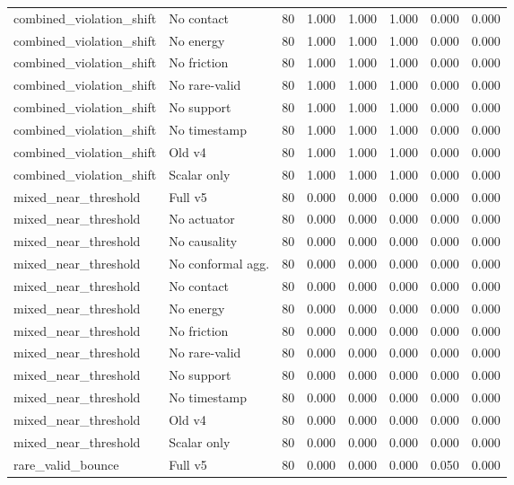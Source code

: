 {\begin{longtable}{llrrrrrr}
combined\_violation\_shift & No contact & 80 & 1.000 & 1.000 & 1.000 & 0.000 & 0.000 \\
combined\_violation\_shift & No energy & 80 & 1.000 & 1.000 & 1.000 & 0.000 & 0.000 \\
combined\_violation\_shift & No friction & 80 & 1.000 & 1.000 & 1.000 & 0.000 & 0.000 \\
combined\_violation\_shift & No rare-valid & 80 & 1.000 & 1.000 & 1.000 & 0.000 & 0.000 \\
combined\_violation\_shift & No support & 80 & 1.000 & 1.000 & 1.000 & 0.000 & 0.000 \\
combined\_violation\_shift & No timestamp & 80 & 1.000 & 1.000 & 1.000 & 0.000 & 0.000 \\
combined\_violation\_shift & Old v4 & 80 & 1.000 & 1.000 & 1.000 & 0.000 & 0.000 \\
combined\_violation\_shift & Scalar only & 80 & 1.000 & 1.000 & 1.000 & 0.000 & 0.000 \\
mixed\_near\_threshold & Full v5 & 80 & 0.000 & 0.000 & 0.000 & 0.000 & 0.000 \\
mixed\_near\_threshold & No actuator & 80 & 0.000 & 0.000 & 0.000 & 0.000 & 0.000 \\
mixed\_near\_threshold & No causality & 80 & 0.000 & 0.000 & 0.000 & 0.000 & 0.000 \\
mixed\_near\_threshold & No conformal agg. & 80 & 0.000 & 0.000 & 0.000 & 0.000 & 0.000 \\
mixed\_near\_threshold & No contact & 80 & 0.000 & 0.000 & 0.000 & 0.000 & 0.000 \\
mixed\_near\_threshold & No energy & 80 & 0.000 & 0.000 & 0.000 & 0.000 & 0.000 \\
mixed\_near\_threshold & No friction & 80 & 0.000 & 0.000 & 0.000 & 0.000 & 0.000 \\
mixed\_near\_threshold & No rare-valid & 80 & 0.000 & 0.000 & 0.000 & 0.000 & 0.000 \\
mixed\_near\_threshold & No support & 80 & 0.000 & 0.000 & 0.000 & 0.000 & 0.000 \\
mixed\_near\_threshold & No timestamp & 80 & 0.000 & 0.000 & 0.000 & 0.000 & 0.000 \\
mixed\_near\_threshold & Old v4 & 80 & 0.000 & 0.000 & 0.000 & 0.000 & 0.000 \\
mixed\_near\_threshold & Scalar only & 80 & 0.000 & 0.000 & 0.000 & 0.000 & 0.000 \\
rare\_valid\_bounce & Full v5 & 80 & 0.000 & 0.000 & 0.000 & 0.050 & 0.000 \\

\end{longtable}}
